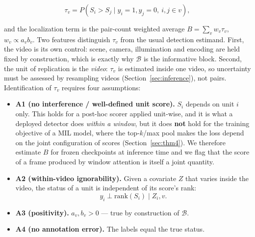 \documentclass[number,preprint,12pt]{elsarticle}
\providecommand{\tightlist}{\setlength{\itemsep}{0pt}\setlength{\parskip}{0pt}}
\begin{document}
\begin{equation}
\tau_v=P(S_i>S_j\mid y_i=1,y_j=0,\ i,j\in v),
\end{equation}

and the localization term is the pair-count weighted average \(B=\sum_v w_v\tau_v\),
\(w_v\propto a_v b_v\). Two features distinguish \(\tau_v\) from the usual detection
estimand. First, the video is its own control: scene, camera, illumination and
encoding are held fixed by construction, which is exactly why \(\mathcal{B}\) is the
informative block. Second, the unit of replication is the \emph{video}: \(\tau_v\) is
estimated inside one video, so uncertainty must be assessed by resampling videos
(Section~\ref{sec:inference}), not pairs. Identification of \(\tau_v\) requires
four assumptions:

\begin{itemize}
\tightlist
\item
  \textbf{A1 (no interference / well-defined unit score).} \(S_i\) depends on unit \(i\)
  only. This holds for a post-hoc scorer applied unit-wise, and it is what a
  deployed detector does \emph{within a window}, but it does \textbf{not} hold for the
  training objective of a MIL model, where the top-\(k\)/max pool makes the loss
  depend on the joint configuration of scores (Section~\ref{sec:thm4}). We therefore estimate \(B\)
  for frozen checkpoints at inference time and we flag that the score of a frame
  produced by window attention is itself a joint quantity.
\item
  \textbf{A2 (within-video ignorability).} Given a covariate \(Z\) that varies inside
  the video, the status of a unit is independent of its score's rank:
  \begin{equation}
  y_i \perp \mathrm{rank}(S_i)\mid Z_i,v.
  \end{equation}
\item
  \textbf{A3 (positivity).} \(a_v,b_v>0\) --- true by construction of \(\mathcal{B}\).
\item
  \textbf{A4 (no annotation error).} The labels equal the true status.
\end{itemize}
\end{document}
